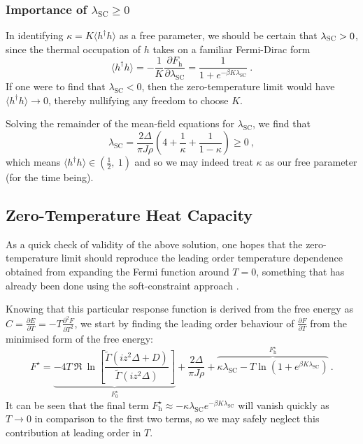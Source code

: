\documentclass[12pt]{article}
\begin{document}
\subsubsection{Importance of $ \lambda_{\text{SC}} \geq 0 $}

In identifying $ \kappa = K \langle h^{\dagger} h \rangle $ as a free parameter, we should be certain that $ \lambda_{\textsc{SC}} > 0 $, since the thermal occupation of $ h $ takes on a familiar Fermi-Dirac form $$ \langle h^{\dagger} h \rangle = - \frac{1}{K} \frac{\partial F_{\text{h}}}{\partial \lambda_{\text{SC}}} = \frac{1}{1 + e^{- \beta K \lambda_{\text{SC}}}} ~. $$ If one were to find that $ \lambda_{\text{SC}} < 0 $, then the zero-temperature limit would have $ \langle h^{\dagger} h \rangle \rightarrow 0 $, thereby nullifying any freedom to choose $ K $.

Solving the remainder of the mean-field equations for $ \lambda_{\text{SC}} $, we find that
\begin{equation}
\lambda_{\text{SC}} = \frac{2 \Delta}{\pi J \rho} \left( 4 + \frac{1}{\kappa} + \frac{1}{1 - \kappa} \right) \geq 0 ~,
\label{eq:soln_lambda_SC} %
\end{equation} which means $ \langle h^{\dagger} h \rangle \in (\frac{1}{2}, ~ 1) $ and so we may indeed treat $ \kappa $ as our free parameter (for the time being).

\subsection{Zero-Temperature Heat Capacity}

As a quick check of validity of the above solution, one hopes that the zero-temperature limit should reproduce the leading order temperature dependence obtained from expanding the Fermi function around $ T = 0 $, something that has already been done using the soft-constraint approach \cite{Draft}.

Knowing that this particular response function is derived from the free energy as $ C = \frac{\partial E}{\partial T} = - T \frac{\partial^{2} F}{\partial T ^2} $, we start by finding the leading order behaviour of $ \frac{\partial F}{\partial T} $ from the minimised form of the free energy:
\begin{equation}
F^{\star} = \underbrace{- 4 T ~ \Re{ ~ \ln{\left[ \frac{\widetilde{\Gamma}(i z^2 \Delta + D)}{\widetilde{\Gamma}(i z^2 \Delta)} \right]}}}_{F_0^{\star}} + \frac{2 \Delta}{\pi J \rho} + \overbrace{\kappa \lambda_{\text{SC}}  - T \ln{\left( 1 + e^{\beta K \lambda_{\text{SC}}} \right)}}^{F_{\text{h}}^{\star}} ~ .
\end{equation}
It can be seen that the final term $ F_{\text{h}}^{\star} \approx - \kappa \lambda_{\text{SC}} e^{- \beta K \lambda_{\text{SC}}} $ will vanish quickly as $ T \rightarrow 0 $ in comparison to the first two terms, so we may safely neglect this contribution at leading order in $ T $.
\end{document}
